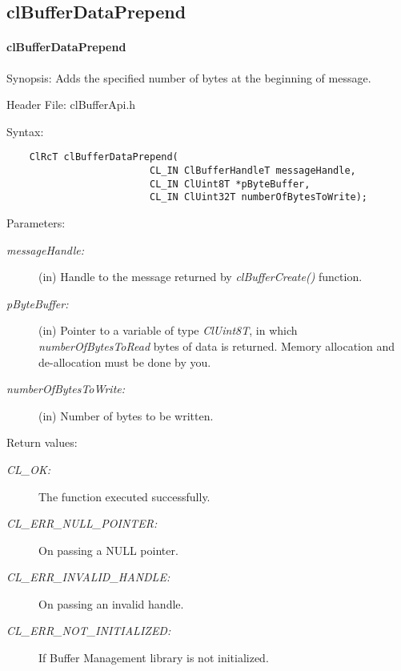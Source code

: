 \subsection{clBufferDataPrepend}
\hypertarget{pagebuf115}{}\paragraph{cl\-Buffer\-Data\-Prepend}\label{pagebuf115}
\begin{Desc}
\item[Synopsis:]Adds the specified number of bytes at the beginning of message.\end{Desc}
\begin{Desc}
\item[Header File:]clBufferApi.h\end{Desc}
\begin{Desc}
\item[Syntax:]

\footnotesize\begin{verbatim}    ClRcT clBufferDataPrepend(
                         CL_IN ClBufferHandleT messageHandle,
                         CL_IN ClUint8T *pByteBuffer,
                         CL_IN ClUint32T numberOfBytesToWrite);
\end{verbatim}
\normalsize
\end{Desc}
\begin{Desc}
\item[Parameters:]
\begin{description}
\item[{\em message\-Handle:}](in) Handle to the message returned by \textit{clBufferCreate()} function. \item[{\em p\-Byte\-Buffer:}](in) Pointer
to a variable of type {\em Cl\-Uint8T\/}, in which {\em number\-Of\-Bytes\-To\-Read\/} bytes of data is returned. Memory allocation and de-allocation 
must be done by you. \item[{\em number\-Of\-Bytes\-To\-Write:}](in) Number of bytes to be written.\end{description}
\end{Desc}
\begin{Desc}
\item[Return values:]
\begin{description}
\item[{\em CL\_\-OK:}]The function executed successfully. \item[{\em CL\_\-ERR\_\-NULL\_\-POINTER:}]On passing a NULL pointer. \item[{\em CL\_\-ERR\_\-INVALID\_\-HANDLE:}]On passing an invalid handle. \item[{\em CL\_\-ERR\_\-NOT\_\-INITIALIZED:}]If Buffer Management library is not initialized.\end{description}
\end{Desc}
